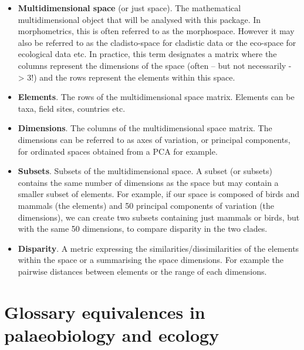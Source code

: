 \documentclass[]{book}
\theoremstyle{definition}
\theoremstyle{definition}
\theoremstyle{definition}
\theoremstyle{remark}
\begin{document}
\begin{itemize}
\item
  \textbf{Multidimensional space} (or just space). The mathematical
  multidimensional object that will be analysed with this package. In
  morphometrics, this is often referred to as the morphospace. However
  it may also be referred to as the cladisto-space for cladistic data or
  the eco-space for ecological data etc. In practice, this term
  designates a matrix where the columns represent the dimensions of the
  space (often -- but not necessarily - \textgreater{} 3!) and the rows
  represent the elements within this space.
\item
  \textbf{Elements}. The rows of the multidimensional space matrix.
  Elements can be taxa, field sites, countries etc.
\item
  \textbf{Dimensions}. The columns of the multidimensional space matrix.
  The dimensions can be referred to as axes of variation, or principal
  components, for ordinated spaces obtained from a PCA for example.
\item
  \textbf{Subsets}. Subsets of the multidimensional space. A subset (or
  subsets) contains the same number of dimensions as the space but may
  contain a smaller subset of elements. For example, if our space is
  composed of birds and mammals (the elements) and 50 principal
  components of variation (the dimensions), we can create two subsets
  containing just mammals or birds, but with the same 50 dimensions, to
  compare disparity in the two clades.
\item
  \textbf{Disparity}. A metric expressing the
  similarities/dissimilarities of the elements within the space or a
  summarising the space dimensions. For example the pairwise distances
  between elements or the range of each dimensions.
\end{itemize}

\section{Glossary equivalences in palaeobiology and
ecology}\label{glossary-equivalences-in-palaeobiology-and-ecology}
\end{document}
